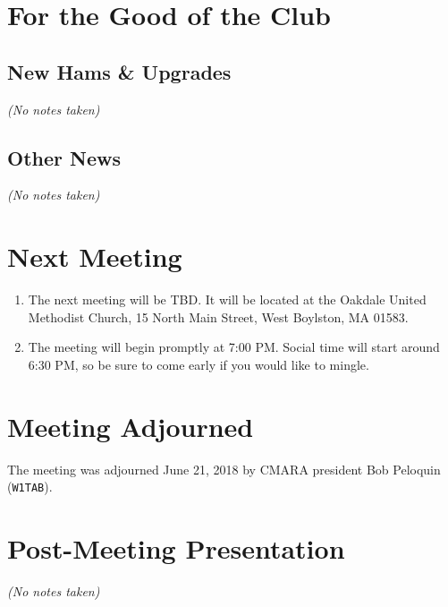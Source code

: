 \documentclass[10pt,letterpaper]{article}
\begin{document}
\section{For the Good of the Club}

\subsection{New Hams \& Upgrades}
\emph{(No notes taken)}

\subsection{Other News}
\emph{(No notes taken)}

\section{Next Meeting}
\begin{enumerate}
  \item The next meeting will be TBD. It will be located at the Oakdale United Methodist Church, 15 North Main Street, West Boylston, MA 01583.
  \item The meeting will begin promptly at 7:00 PM. Social time will start around 6:30 PM, so be sure to come early if you would like to mingle.
\end{enumerate}

\section{Meeting Adjourned}
The meeting was adjourned June 21, 2018 by CMARA president Bob Peloquin (\texttt{W1TAB}).

\section{Post-Meeting Presentation}
\emph{(No notes taken)}
\end{document}
